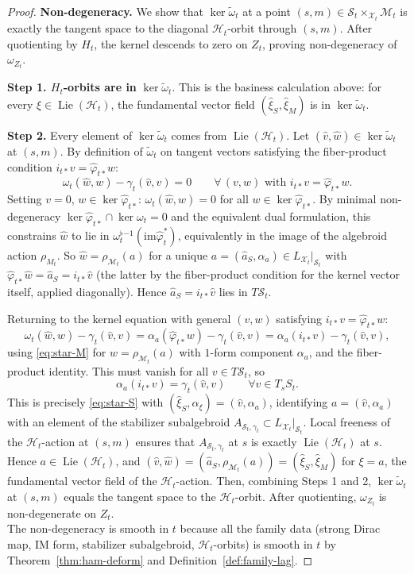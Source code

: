 \documentclass[reqno]{amsart}
\theoremstyle{plain}
\theoremstyle{definition}
\renewcommand{\H}{\mathcal{H}}
\renewcommand{\S}{\mathcal{S}}
\newcommand{\M}{\mathcal{M}}
\newcommand{\X}{\mathcal{X}}
\newcommand{\Lie}{\operatorname{Lie}}
\begin{document}
\begin{proof}
\medskip


\noindent\textbf{Non-degeneracy.}
We show that $\ker \widetilde\omega_t$ at a point
$(s, m) \in \S_t \times_{\X_t} \M_t$ is exactly the tangent space to the
diagonal $\H_t$-orbit through $(s, m)$. After quotienting by $H_t$, the
kernel descends to zero on $Z_t$, proving non-degeneracy of
$\omega_{Z_t}$.
 
\noindent\textbf{Step 1. $H_t$-orbits are in} $\ker \widetilde\omega_t$. This is
the basiness calculation above: for every $\xi \in \Lie(\H_t)$, the fundamental vector field $(\hat\xi_S, \hat\xi_M)$ is in
$\ker \widetilde\omega_t$.
 
\noindent\textbf{Step 2.} Every element of $\ker \widetilde\omega_t$ comes from
$\Lie(\H_t)$. Let
$(\hat v, \hat w) \in \ker \widetilde\omega_t$ at $(s, m)$. By
definition of $\widetilde\omega_t$ on tangent vectors satisfying the fiber-product condition $i_{t*}v = \hat\varphi_{t*}w$:
\[
   \omega_t(\hat w, w) - \gamma_t(\hat v, v) = 0
   \qquad \forall\, (v, w) \text{ with } i_{t*}v = \hat\varphi_{t*}w.
\]
Setting $v = 0$, $w \in \ker \hat\varphi_{t*}$:
$\omega_t(\hat w, w) = 0$ for all $w \in \ker \hat\varphi_{t*}$. By
minimal non-degeneracy
$\ker \hat\varphi_{t*} \cap \ker \omega_t = 0$ and the equivalent dual
formulation, this constrains $\hat w$ to lie in
$\omega_t^\flat{}^{-1}(\text{im} \hat\varphi_t^{*})$, equivalently in the
image of the algebroid action $\rho_{M_t}$. So
$\hat w = \rho_{\M_t}(a)$ for a unique
$a = (\hat a_S, \alpha_a) \in L_{\X_t}|_{\S_t}$ with
$\hat\varphi_{t*}\hat w = \hat a_S = i_{t*}\hat v$ (the latter by the
fiber-product condition for the kernel vector itself, applied
diagonally). Hence $\hat a_S = i_{t*}\hat v$ lies in $T\S_t$.
 
Returning to the kernel equation with general $(v, w)$ satisfying
$i_{t*}v = \hat\varphi_{t*}w$:
\[
   \omega_t(\hat w, w) - \gamma_t(\hat v, v)
   = \alpha_a(\hat\varphi_{t*}w) - \gamma_t(\hat v, v)
   = \alpha_a(i_{t*}v) - \gamma_t(\hat v, v),
\]
using \eqref{eq:star-M} for $\hat w = \rho_{\M_t}(a)$ with $1$-form
component $\alpha_a$, and the fiber-product identity. This must vanish
for all $v \in T\S_t$, so
\[
   \alpha_a(i_{t*}v) = \gamma_t(\hat v, v) \qquad \forall v \in T_s S_t.
\]
This is precisely \eqref{eq:star-S} with
$(\hat\xi_S, \alpha_\xi) = (\hat v, \alpha_a)$, identifying
$a = (\hat v, \alpha_a)$ with an element of the stabilizer subalgebroid
$A_{\S_t,\gamma_t} \subset L_{\X_t}|_{\S_t}$. Local freeness of the
$\H_t$-action at $(s, m)$ ensures that
$A_{\S_t,\gamma_t}$ at $s$ is exactly $\Lie(\H_t)$ at $s$. Hence
$a \in \Lie(\H_t)$, and $(\hat v, \hat w) = (\hat a_S, \rho_{\M_t}(a))
 = (\hat\xi_S, \hat\xi_M)$ for $\xi = a$, the fundamental vector field
of the $\H_t$-action. Then, combining Steps 1 and 2, $\ker \widetilde\omega_t$ at $(s, m)$ equals the
tangent space to the $\H_t$-orbit. After quotienting,
$\omega_{Z_t}$ is non-degenerate on $Z_t$.\\

The non-degeneracy is smooth in $t$ because all the family data
(strong Dirac map, IM form, stabilizer subalgebroid, $\H_t$-orbits) is smooth in $t$ by Theorem~\ref{thm:ham-deform} and
Definition~\ref{def:family-lag}.
\end{proof}
\end{document}
